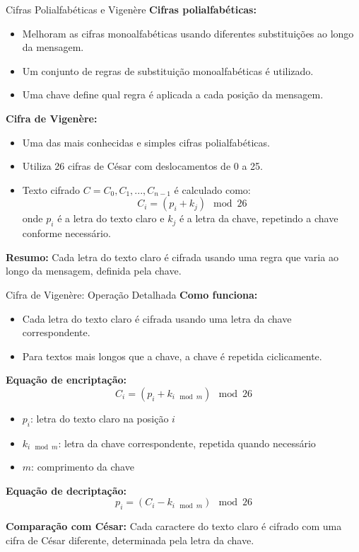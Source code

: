 \begin{frame}{Cifras Polialfabéticas e Vigenère}
\textbf{Cifras polialfabéticas:}
\begin{itemize}
    \item Melhoram as cifras monoalfabéticas usando diferentes substituições ao longo da mensagem.
    \item Um conjunto de regras de substituição monoalfabéticas é utilizado.
    \item Uma chave define qual regra é aplicada a cada posição da mensagem.
\end{itemize}

\textbf{Cifra de Vigenère:}
\begin{itemize}
    \item Uma das mais conhecidas e simples cifras polialfabéticas.
    \item Utiliza 26 cifras de César com deslocamentos de 0 a 25.
    \item Texto cifrado $C = C_0, C_1, ..., C_{n-1}$ é calculado como:
    \[
        C_i = (p_i + k_j) \mod 26
    \]
    onde $p_i$ é a letra do texto claro e $k_j$ é a letra da chave, repetindo a chave conforme necessário.
\end{itemize}

\textbf{Resumo:}  
Cada letra do texto claro é cifrada usando uma regra que varia ao longo da mensagem, definida pela chave.
\end{frame}

\begin{frame}{Cifra de Vigenère: Operação Detalhada}
\textbf{Como funciona:}
\begin{itemize}
    \item Cada letra do texto claro é cifrada usando uma letra da chave correspondente.
    \item Para textos mais longos que a chave, a chave é repetida ciclicamente.
\end{itemize}

\textbf{Equação de encriptação:}
\[
C_i = (p_i + k_{i \mod m}) \mod 26
\]
\begin{itemize}
    \item $p_i$: letra do texto claro na posição $i$
    \item $k_{i \mod m}$: letra da chave correspondente, repetida quando necessário
    \item $m$: comprimento da chave
\end{itemize}

\textbf{Equação de decriptação:}
\[
p_i = (C_i - k_{i \mod m}) \mod 26
\]

\textbf{Comparação com César:}  
Cada caractere do texto claro é cifrado com uma cifra de César diferente, determinada pela letra da chave.

\end{frame}

